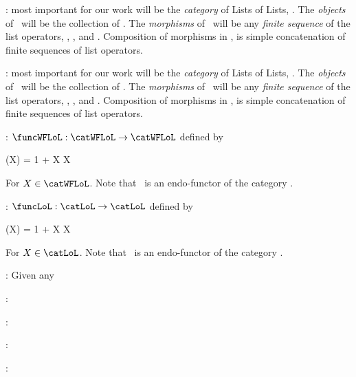 \item {} 

\item {}: most important for our work will be 
the \emph{category} of Lists of Lists, \catWFLoL. The \emph{objects} of 
\catWFLoL\ will be the collection of \wflols. The \emph{morphisms} of 
\catWFLoL\ will be any \emph{finite sequence} of the list operators, 
, ,  and . Composition of 
morphisms in \catWFLoL, is simple concatenation of finite sequences of list 
operators. 

\item {}: most important for our work will be 
the \emph{category} of Lists of Lists, \catLoL. The \emph{objects} of 
\catLoL\ will be the collection of \lols. The \emph{morphisms} of 
\catLoL\ will be any \emph{finite sequence} of the list operators, 
, ,  and . Composition of 
morphisms in \catLoL, is simple concatenation of finite sequences of list 
operators. 

\item {}: $\funcWFLoL : \catWFLoL \rightarrow \catWFLoL$ 
defined by 

\placeformula[+]\startformula
  \funcWFLoL(X) = 1 + X \times X
\stopformula

\noindent For $X \in \catWFLoL$. Note that \funcWFLoL\ is an endo-functor of 
the category \catWFLoL. 

\item {}: $\funcLoL : \catLoL \rightarrow \catLoL$ 
defined by 

\placeformula[+]\startformula
  \funcLoL(X) = 1 + X \times X
\stopformula

\noindent For $X \in \catLoL$. Note that \funcLoL\ is an endo-functor of 
the category \catLoL. 

\item {}: Given any 

\item {}:

\item {}:

\item {}:

\item {}:

